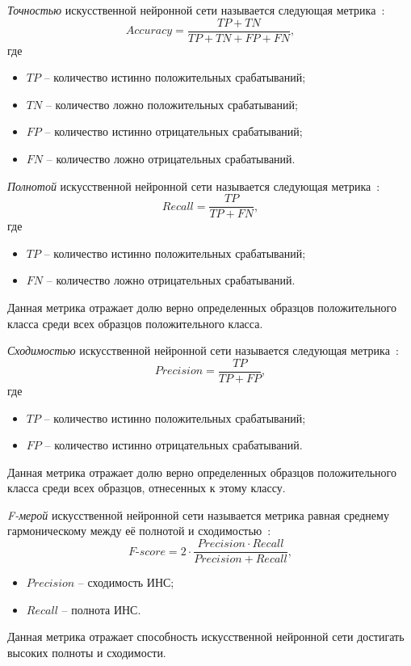\textit{Точностью} искусственной нейронной сети называется следующая метрика~\cite{ml}:
\begin{equation}
	Accuracy = \frac{TP + TN}{TP + TN + FP + FN},
\end{equation}
где
\begin{itemize}
	\item $TP$ -- количество истинно положительных срабатываний;
	\item $TN$ -- количество ложно положительных срабатываний;
	\item $FP$ -- количество истинно отрицательных срабатываний;
	\item $FN$ -- количество ложно отрицательных срабатываний.
\end{itemize}

\textit{Полнотой} искусственной нейронной сети называется следующая метрика~\cite{ml}:
\begin{equation}
	Recall = \frac{TP}{TP + FN},
\end{equation}
где
\begin{itemize}
	\item $TP$ -- количество истинно положительных срабатываний;
	\item $FN$ -- количество ложно отрицательных срабатываний.
\end{itemize}
Данная метрика отражает долю верно определенных образцов положительного класса среди всех образцов положительного класса.

\textit{Сходимостью} искусственной нейронной сети называется следующая метрика~\cite{ml}:
\begin{equation}
	Precision = \frac{TP}{TP + FP},
\end{equation}
где
\begin{itemize}
	\item $TP$ -- количество истинно положительных срабатываний;
	\item $FP$ -- количество истинно отрицательных срабатываний.
\end{itemize}
Данная метрика отражает долю  верно определенных образцов положительного класса среди всех образцов, отнесенных к этому классу.

\textit{F-мерой} искусственной нейронной сети называется метрика равная среднему гармоническому между её полнотой и сходимостью~\cite{ml}:
\begin{equation}
	\textit{F-score} = 2 \cdot \frac{Precision \cdot Recall}{Precision + Recall},
\end{equation}
\begin{itemize}
	\item $Precision$ -- сходимость ИНС;
	\item $Recall$ -- полнота ИНС.
\end{itemize}
Данная метрика отражает способность искусственной нейронной сети достигать высоких полноты и сходимости.

